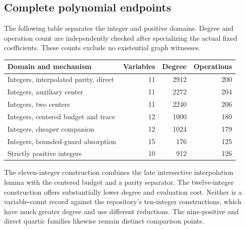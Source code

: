 \subsection{Complete polynomial endpoints}
The following table separates the integer and positive domains. Degree and
operation count are independently checked after specializing the actual
fixed coefficients. These counts exclude no existential graph witnesses.
\begin{center}
\begin{tabular}{@{}lrrr@{}}
\toprule
Domain and mechanism & Variables & Degree & Operations\\
\midrule
Integers, interpolated parity, direct & 11 & 2912 & 200\\
Integers, auxiliary center & 11 & 2272 & 204\\
Integers, two centers & 11 & 2240 & 206\\
Integers, centered budget and trace & 12 & 1000 & 180\\
Integers, cheaper companion & 12 & 1024 & 179\\
Integers, bounded-guard absorption & 15 & 176 & 125\\
Strictly positive integers & 10 & 912 & 126\\
\bottomrule
\end{tabular}
\end{center}
The eleven-integer construction combines the late intersective interpolation
lemma with the centered budget and a parity separator. The twelve-integer
construction offers substantially lower degree and evaluation cost. Neither
is a variable-count record against the repository's ten-integer constructions,
which have much greater degree and use different reductions. The nine-positive
and direct quartic families likewise remain distinct comparison points.

